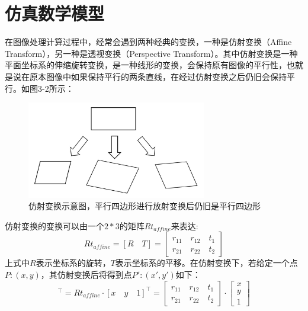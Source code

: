 \section{仿真数学模型}
在图像处理计算过程中，经常会遇到两种经典的变换，一种是仿射变换（Affine Transform），另一种是透视变换（Perspective Transform）。其中仿射变换是一种平面坐标系的伸缩旋转变换，是一种线形的变换，会保持原有图像的平行性，也就是说在原本图像中如果保持平行的两条直线，在经过仿射变换之后仍旧会保持平行。如图3-2所示：

\begin{figure}[htb]
	\centering 
	\includegraphics[width=0.7\textwidth]{./mypic/仿射变换示意图.jpg} 
	\caption{仿射变换示意图，平行四边形进行放射变换后仍旧是平行四边形} 
\end{figure}

仿射变换的变换可以由一个$2*3$的矩阵$Rt_{affine}$来表达:
\begin{equation}
	Rt_{affine}=\left[R\quad T\right]=
	\left[
	\begin{aligned}
	r_{11}\quad r_{12}\quad t_1 \\
	r_{21}\quad r_{22}\quad t_2
	\end{aligned}
	\right]
\end{equation}
上式中$R$表示坐标系的旋转，$T$表示坐标系的平移。在仿射变换下，若给定一个点$P:(x,y)$，其仿射变换后将得到点$P':(x',y')$如下：
\begin{equation}
	[x'\quad y']^\top=Rt_{affine}\cdot [x\quad y\quad 1]^\top=
	\left[
	\begin{aligned}
	r_{11}\quad r_{12}\quad t_1 \\
	r_{21}\quad r_{22}\quad t_2
	\end{aligned}
	\right]\cdot 
	\left[
	\begin{aligned}
	x \\
	y \\
	1
	\end{aligned}
	\right]
\end{equation}
		
